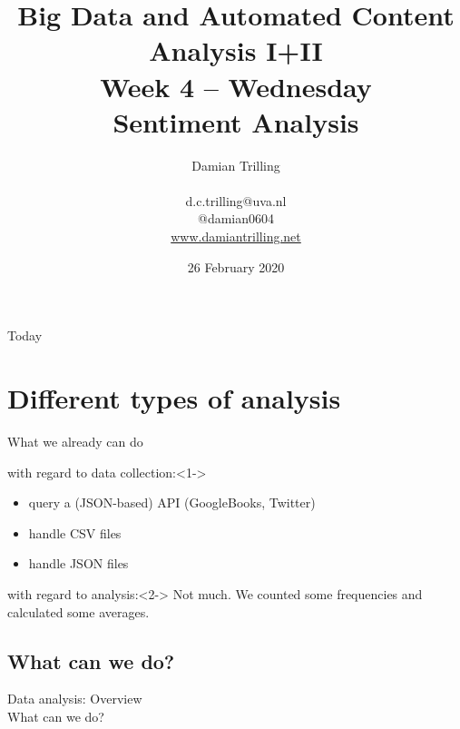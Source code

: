 \documentclass{beamer}
\begin{document}
\title[Big Data and Automated Content Analysis]{\textbf{Big Data and Automated Content Analysis I+II} \\ Week 4 -- Wednesday \\ Sentiment Analysis}
\author[Damian Trilling]{Damian Trilling \\ ~ \\ \footnotesize{d.c.trilling@uva.nl \\@damian0604} \\ \url{www.damiantrilling.net}}
\date{26 February 2020}


\begin{frame}{}
\titlepage
\end{frame}

\begin{frame}{Today}
\tableofcontents
\end{frame}



\section{Different types of analysis}

\begin{frame}{What we already can do}
\begin{block}{with regard to data collection:}<1->
\begin{itemize}
\item query a (JSON-based) API (GoogleBooks, Twitter)
\item handle CSV files
\item handle JSON files 
\end{itemize}
\end{block}

\begin{block}{with regard to analysis:}<2->
Not much. We counted some frequencies and calculated some averages.
\end{block}

\end{frame}



\subsection{What can we do?}
\begin{frame}
Data analysis: Overview\\
What can we do? \\ ~\\
\end{frame}
\end{document}
